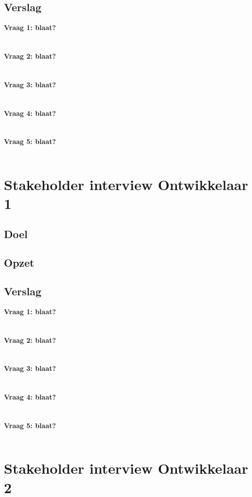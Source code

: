 \subsection{Verslag}
\textbf{Vraag 1: blaat?}\\
\lipsum[01]\\
\\
\textbf{Vraag 2: blaat?}\\
\lipsum[02]\\
\\
\textbf{Vraag 3: blaat?}\\
\lipsum[03]\\
\\
\textbf{Vraag 4: blaat?}\\
\lipsum[04]\\
\\
\textbf{Vraag 5: blaat?}\\
\lipsum[05]\\

\section{Stakeholder interview Ontwikkelaar 1}
\subsection{Doel}
\subsection{Opzet}
\subsection{Verslag}
\textbf{Vraag 1: blaat?}\\
\lipsum[01]\\
\\
\textbf{Vraag 2: blaat?}\\
\lipsum[02]\\
\\
\textbf{Vraag 3: blaat?}\\
\lipsum[03]\\
\\
\textbf{Vraag 4: blaat?}\\
\lipsum[04]\\
\\
\textbf{Vraag 5: blaat?}\\
\lipsum[05]\\


\section{Stakeholder interview Ontwikkelaar 2}
